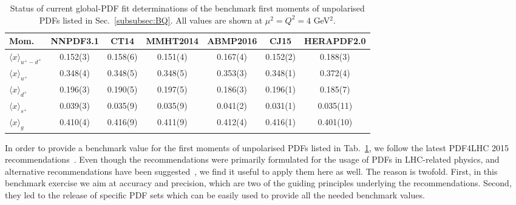 \begin{table}[t]
\centering
\begin{tabular}{lcccccc}
\toprule
Mom. 
& NNPDF3.1 & CT14 & MMHT2014 & ABMP2016 & CJ15 & HERAPDF2.0 \\
\midrule
$\langle x \rangle_{u^+-d^+}$ 
& 0.152(3) & 0.158(6) & 0.151(4) & 0.167(4) & 0.152(2) & 0.188(3)\\
$\langle x \rangle_{u^+}$    
& 0.348(4) & 0.348(5) & 0.348(5) & 0.353(3) & 0.348(1) & 0.372(4)\\
$\langle x \rangle_{d^+}$    
& 0.196(3) & 0.190(5) & 0.197(5) & 0.186(3) & 0.196(1) & 0.185(7)\\
$\langle x \rangle_{s^+}$    
& 0.039(3) & 0.035(9) & 0.035(9) & 0.041(2) & 0.031(1) & 0.035(11)\\
$\langle x \rangle_{g}$     
& 0.410(4) & 0.416(9) & 0.411(9) & 0.412(4) & 0.416(1) & 0.401(10)\\
\bottomrule
\end{tabular}
\caption{\small Status of current global-PDF fit determinations of the 
benchmark first moments of unpolarised PDFs listed in Sec.~\ref{subsubsec:BQ}.
All values are shown at $\mu^2=Q^2=4$ GeV$^2$.}
\label{tab:unpPDFmoms}
\end{table}

In order to provide a benchmark value for the first moments of unpolarised PDFs
listed in Tab.~\ref{tab:unpPDFmoms}, we follow the latest PDF4LHC 2015 
recommendations~\cite{Butterworth:2015oua}.
%
Even though the recommendations were primarily formulated for the usage of PDFs
in LHC-related physics, and alternative recommendations have been 
suggested~\cite{Accardi:2016ndt}, we find it useful to apply them here as well.
%
The reason is twofold.
%
First, in this benchmark exercise we aim at accuracy and precision, which are 
two of the guiding principles underlying the recommendations.
%
Second, they led to the release of specific PDF sets which can be easily 
used to provide all the needed benchmark values.

